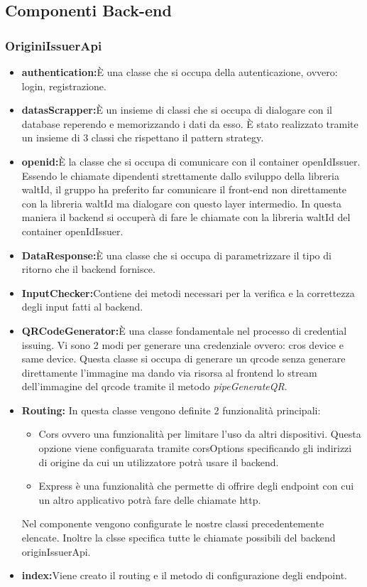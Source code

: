 \subsection{Componenti Back-end}
\subsubsection{OriginiIssuerApi}
\begin{itemize}
    \item \textbf{authentication:}È una classe che si occupa della autenticazione, ovvero: login, registrazione. 
    \item \textbf{datasScrapper:}È un insieme di classi che si occupa di dialogare con il database reperendo e memorizzando i dati da esso. È stato realizzato tramite un insieme di 3 classi che rispettano il pattern strategy. 
    \item \textbf{openid:}È la classe che si occupa di comunicare con il container openIdIssuer. Essendo le chiamate dipendenti strettamente dallo sviluppo della libreria waltId, il gruppo ha preferito far comunicare il front-end non direttamente con la libreria waltId ma dialogare con questo layer intermedio. In questa maniera il backend si occuperà di fare le chiamate con la libreria waltId del container openIdIssuer.
    \item \textbf{DataResponse:}È una classe che si occupa di parametrizzare il tipo di ritorno che il backend fornisce.
    \item \textbf{InputChecker:}Contiene dei metodi necessari per la verifica e la correttezza degli input fatti al backend.
    \item \textbf{QRCodeGenerator:}È una classe fondamentale nel processo di credential issuing. Vi sono 2 modi per generare una credenziale ovvero: cros device e same device. Questa classe si occupa di generare un qrcode senza generare direttamente l'immagine ma dando via risorsa al frontend lo stream dell'immagine del qrcode tramite il metodo \textit{pipeGenerateQR}.
    \item \textbf{Routing:} In questa classe vengono definite 2 funzionalità principali:
     \begin{itemize}
     \item Cors ovvero una funzionalità per limitare l'uso da altri dispositivi. Questa opzione viene configuarata tramite corsOptions specificando gli indirizzi di origine da cui un utilizzatore potrà usare il backend. 
     \item Express è una funzionalità che permette di offrire degli endpoint con cui un altro applicativo potrà fare delle chiamate http. 
     \end{itemize}
    Nel componente vengono configurate le nostre classi precedentemente elencate.
    Inoltre la clsse specifica tutte le chiamate possibili del backend originIssuerApi.

    
    \item \textbf{index:}Viene creato il routing e il metodo di configurazione degli endpoint.
\end{itemize}
